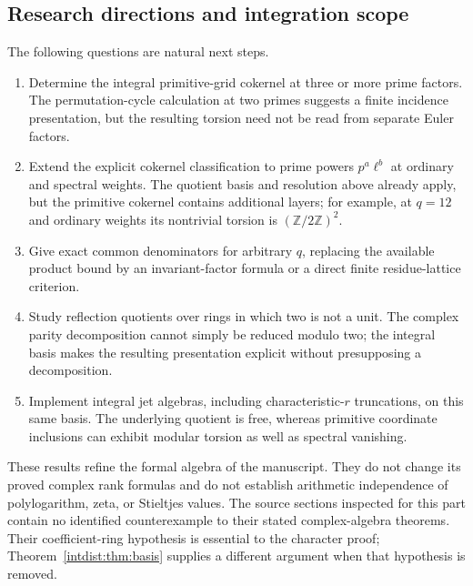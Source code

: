 \documentclass[11pt,a4paper]{article}
\numberwithin{equation}{section}
\theoremstyle{plain}
\theoremstyle{definition}
\theoremstyle{remark}
\begin{document}
\subsection{Research directions and integration scope}

The following questions are natural next steps.
\begin{enumerate}
\item Determine the integral primitive-grid cokernel at three or more
prime factors. The permutation-cycle calculation at two primes
suggests a finite incidence presentation, but the resulting torsion
need not be read from separate Euler factors.
\item Extend the explicit cokernel classification to prime powers
$p^a\ell^b$ at ordinary and spectral weights. The quotient basis and
resolution above already apply, but the primitive cokernel contains
additional layers; for example, at $q=12$ and ordinary weights its
nontrivial torsion is $(\mathbb Z/2\mathbb Z)^2$.
\item Give exact common denominators for arbitrary $q$, replacing the
available product bound by an invariant-factor formula or a direct
finite residue-lattice criterion.
\item Study reflection quotients over rings in which two is not a
unit. The complex parity decomposition cannot simply be reduced
modulo two; the integral basis makes the resulting presentation
explicit without presupposing a decomposition.
\item Implement integral jet algebras, including characteristic-$r$
truncations, on this same basis. The underlying quotient is free,
whereas primitive coordinate inclusions can exhibit modular torsion
as well as spectral vanishing.
\end{enumerate}

These results refine the formal algebra of the manuscript. They do
not change its proved complex rank formulas and do not establish
arithmetic independence of polylogarithm, zeta, or Stieltjes values.
The source sections inspected for this part contain no identified
counterexample to their stated complex-algebra theorems. Their
coefficient-ring hypothesis is essential to the character proof;
Theorem~\ref{intdist:thm:basis} supplies a different argument when that
hypothesis is removed.

\end{document}
